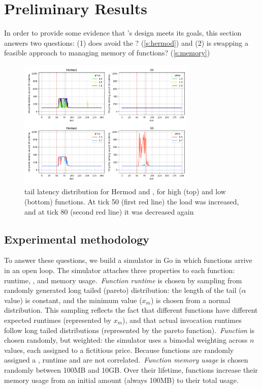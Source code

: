 \section{Preliminary Results}

In order to provide some evidence that \sys{}'s design meets its goals,
this section answers two questions: (1) does \sys avoid the \problem?
(\autoref{s:hermod}) and (2) is swapping a feasible approach to
managing memory of functions? (\autoref{s:memory})

\begin{figure}[t!]
    \centering
      \includegraphics[width=8.5cm]{img/hermod_xx_latencies.png}
      \caption{ tail latency distribution for Hermod and \sys{}, for high (top)
      and low (bottom) \priceclass{} functions. At tick 50 (first red line) the
      load was increased, and at tick 80 (second red line) it was decreased again
      }
    \label{fig:hermod-xx-latencies}
\end{figure}


\subsection{Experimental methodology}

To answer these questions, we build a simulator in Go\cite{golang} in
which functions arrive in an open loop. The simulator attaches three
properties to each function: runtime, \priceclass{}, and memory
usage.~\textit{Function runtime} is chosen by sampling from randomly
generated long tailed (pareto) distribution: the length of the tail
($\alpha$ value) is constant, and the minimum value ($x_m$) is chosen
from a normal distribution. This sampling reflects the fact that
different functions have different expected runtimes (represented by
$x_m$), and that actual invocation runtimes follow long tailed
distributions (represented by the pareto function).~\textit{Function
  \class{}} is chosen randomly, but weighted: the simulator uses a
bimodal weighting across $n$ \priceclass{} values, each assigned to a
fictitious price. Because functions are randomly assigned a \class{},
runtime and \class{} are not correlated.~\textit{Function memory
  usage} is chosen randomly between 100MB and 10GB. Over their
lifetime, functions increase their memory usage from an initial amount
(always 100MB) to their total usage.

